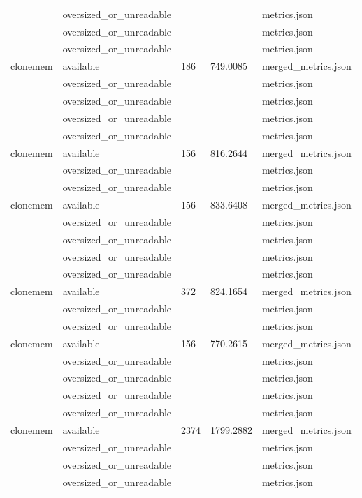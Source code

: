 \begin{tabular}{lllll}
 & oversized_or_unreadable &  &  & metrics.json \\
 & oversized_or_unreadable &  &  & metrics.json \\
 & oversized_or_unreadable &  &  & metrics.json \\
clonemem & available & 186 & 749.0085 & merged_metrics.json \\
 & oversized_or_unreadable &  &  & metrics.json \\
 & oversized_or_unreadable &  &  & metrics.json \\
 & oversized_or_unreadable &  &  & metrics.json \\
 & oversized_or_unreadable &  &  & metrics.json \\
clonemem & available & 156 & 816.2644 & merged_metrics.json \\
 & oversized_or_unreadable &  &  & metrics.json \\
 & oversized_or_unreadable &  &  & metrics.json \\
clonemem & available & 156 & 833.6408 & merged_metrics.json \\
 & oversized_or_unreadable &  &  & metrics.json \\
 & oversized_or_unreadable &  &  & metrics.json \\
 & oversized_or_unreadable &  &  & metrics.json \\
 & oversized_or_unreadable &  &  & metrics.json \\
clonemem & available & 372 & 824.1654 & merged_metrics.json \\
 & oversized_or_unreadable &  &  & metrics.json \\
 & oversized_or_unreadable &  &  & metrics.json \\
clonemem & available & 156 & 770.2615 & merged_metrics.json \\
 & oversized_or_unreadable &  &  & metrics.json \\
 & oversized_or_unreadable &  &  & metrics.json \\
 & oversized_or_unreadable &  &  & metrics.json \\
 & oversized_or_unreadable &  &  & metrics.json \\
clonemem & available & 2374 & 1799.2882 & merged_metrics.json \\
 & oversized_or_unreadable &  &  & metrics.json \\
 & oversized_or_unreadable &  &  & metrics.json \\
 & oversized_or_unreadable &  &  & metrics.json \\

\end{tabular}
